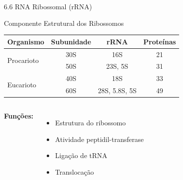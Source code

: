 \begin{frame}[shrink=5]{6.6 RNA Ribossomal (rRNA)}
\begin{block}{Componente Estrutural dos Ribossomos}
\begin{center}
\begin{tabular}{lccc}
\toprule
\textbf{Organismo} & \textbf{Subunidade} & \textbf{rRNA} & \textbf{Proteínas} \\
\midrule
\multirow{2}{*}{Procarioto} & 30S & 16S & 21 \\
                             & 50S & 23S, 5S & 31 \\
\midrule
\multirow{2}{*}{Eucarioto} & 40S & 18S & 33 \\
                           & 60S & 28S, 5.8S, 5S & 49 \\
\bottomrule
\end{tabular}
\end{center}
\end{block}

\vspace{0.3cm}

\begin{columns}
\textbf{Funções:}
\begin{itemize}
    \item Estrutura do ribossomo
    \item Atividade peptidil-transferase
    \item Ligação de tRNA
    \item Translocação
\end{itemize}

\end{columns}
\end{frame}

